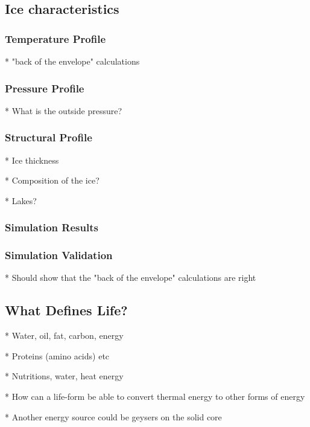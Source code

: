 \documentclass{book}
\begin{document}
\subsection{Ice characteristics} %

\subsubsection{Temperature Profile}

* "back of the envelope" calculations

\subsubsection{Pressure Profile}

* What is the outside pressure?

\subsubsection{Structural Profile}

* Ice thickness

* Composition of the ice? %

* Lakes?

\subsubsection{Simulation Results}

\subsubsection{Simulation Validation}

* Should show that the "back of the envelope" calculations are right

\subsection{What Defines Life?} %

* Water, oil, fat, carbon, energy

* Proteins (amino acids) etc

* Nutritions, water, heat energy

* How can a life-form be able to convert thermal energy to other forms of energy

* Another energy source could be geysers on the solid core
\end{document}
